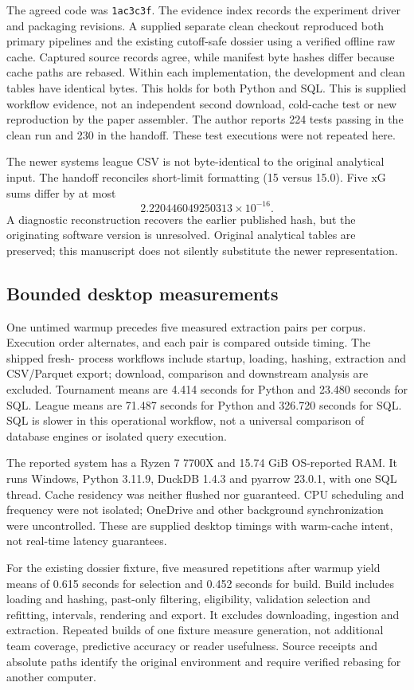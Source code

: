 \documentclass[sigconf,nonacm]{acmart}
\begin{document}
The agreed code was \texttt{1ac3c3f}. The evidence index records the experiment
driver and packaging revisions. A supplied separate clean checkout
reproduced both primary pipelines and the existing cutoff-safe dossier using a
verified offline raw cache. Captured source records agree, while manifest byte
hashes differ because cache paths are rebased. Within each implementation, the development and clean tables have identical
bytes. This holds for both Python and SQL. This is
supplied workflow evidence, not an independent second download, cold-cache test or
new reproduction by the paper assembler. The author reports 224 tests passing in the clean run and 230 in the handoff.
These test executions were not repeated here.

The newer systems league CSV is not byte-identical to the original analytical
input. The handoff reconciles short-limit formatting (15 versus 15.0). Five xG sums
differ by at most
\[2.220446049250313\times10^{-16}.\]
A diagnostic reconstruction recovers the earlier published hash, but the
originating software version is unresolved. Original analytical tables are preserved; this manuscript
does not silently substitute the newer representation.

\subsection{Bounded desktop measurements}
One untimed warmup precedes five measured extraction pairs per corpus. Execution
order alternates, and each pair is compared outside timing. The shipped fresh-
process workflows include startup, loading, hashing, extraction and CSV/Parquet
export; download, comparison and downstream analysis are excluded. Tournament means are 4.414 seconds for Python and 23.480 seconds for SQL. League
means are 71.487 seconds for Python and 326.720 seconds for SQL. SQL is slower in this operational workflow, not a universal comparison
of database engines or isolated query execution.

The reported system has a Ryzen 7 7700X and 15.74 GiB OS-reported RAM. It runs
Windows, Python 3.11.9, DuckDB 1.4.3 and pyarrow 23.0.1, with one SQL thread.
Cache residency was neither flushed nor guaranteed. CPU scheduling and frequency
were not isolated; OneDrive and other background synchronization were uncontrolled. These are supplied desktop
timings with warm-cache intent, not real-time latency guarantees.

For the existing dossier fixture, five measured repetitions after warmup yield
means of 0.615 seconds for selection and 0.452 seconds for build. Build includes
loading and hashing, past-only filtering, eligibility, validation selection and
refitting, intervals, rendering and export. It excludes downloading, ingestion
and extraction. Repeated
builds of one fixture measure generation, not additional team coverage, predictive
accuracy or reader usefulness. Source receipts and absolute paths identify the
original environment and require verified rebasing for another computer.
\end{document}
